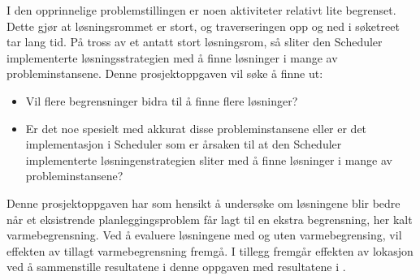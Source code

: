 I den opprinnelige problemstillingen \cite{tvedtbezem} er noen aktiviteter relativt lite begrenset. Dette gjør at løsningsrommet er stort, og traverseringen opp og ned i søketreet tar lang tid. På tross av et antatt stort løsningsrom, så sliter den Scheduler implementerte løsningsstrategien med å finne løsninger i mange av probleminstansene. Denne prosjektoppgaven vil søke å finne ut:

\begin{itemize}
\item Vil flere begrensninger bidra til å finne flere løsninger?
\item Er det noe spesielt med akkurat disse probleminstansene eller er det implementasjon i Scheduler som er årsaken til at den Scheduler implementerte løsningenstrategien sliter med å finne løsninger i mange av probleminstansene?
\end{itemize}

Denne prosjektoppgaven har som hensikt å undersøke om løsningene blir bedre når et eksistrende planleggingsproblem får lagt til en ekstra begrensning, her kalt varmebegrensning. Ved å evaluere løsningene med og uten varmebegrensing, vil effekten av tillagt varmebegrensning fremgå. I tillegg fremgår effekten av lokasjon ved å sammenstille resultatene i denne oppgaven med resultatene i \cite{tvedtbezem}.